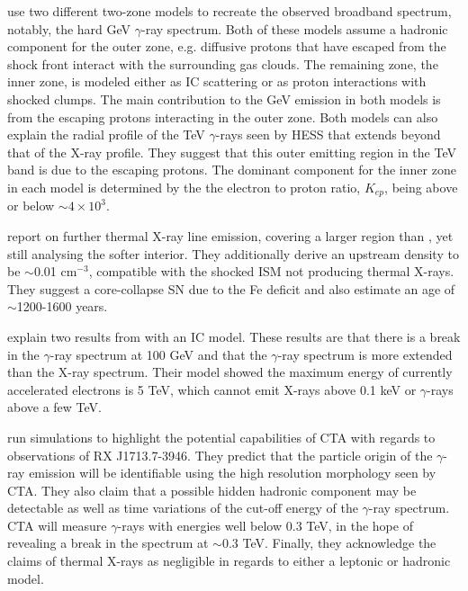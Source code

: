 \documentclass[12pt,a4paper]{article}
\begin{document}
\cite{2016ApJ...821...43Z} use two different two-zone models to recreate the observed broadband spectrum, notably, the hard GeV $\gamma$-ray spectrum. Both of these models assume a hadronic component for the outer zone, e.g. diffusive protons that have escaped from the shock front interact with the surrounding gas clouds. The remaining zone, the inner zone, is modeled either as IC scattering or as proton interactions with shocked clumps. The main contribution to the GeV emission in both models is from the escaping protons interacting in the outer zone. Both models can also explain the radial profile of the TeV $\gamma$-rays seen by HESS that extends beyond that of the X-ray profile. They suggest that this outer emitting region in the TeV band is due to the escaping protons. The dominant component for the inner zone in each model is determined by the the electron to proton ratio, $K_{ep}$, being above or below $\sim 4 \times 10^3$. 

\cite{2017IAUS..331..206K} report on further thermal X-ray line emission, covering a larger region than \cite{2015ApJ...814...29K}, yet still analysing the softer interior. They additionally derive an upstream density to be $\sim$0.01 cm$^{-3}$, compatible with the shocked ISM not producing thermal X-rays. They suggest a core-collapse SN due to the Fe deficit and also estimate an age of $\sim$1200-1600 years.

\cite{2017JHEAp..13...17O} explain two results from \cite{2018A&A...612A...6H} with an IC model. These results are that there is a break in the $\gamma$-ray spectrum at 100 GeV and that the $\gamma$-ray spectrum is more extended than the X-ray spectrum. Their model showed the maximum energy of currently accelerated electrons is 5 TeV, which cannot emit X-rays above 0.1 keV or $\gamma$-rays above a few TeV. 

\cite{2017ApJ...840...74A} run simulations to highlight the potential capabilities of CTA with regards to observations of RX J1713.7-3946. They predict that the particle origin of the $\gamma$-ray emission will be identifiable using the high resolution morphology seen by CTA. They also claim that a possible hidden hadronic component may be detectable as well as time variations of the cut-off energy of the $\gamma$-ray spectrum. CTA will measure $\gamma$-rays with energies well below 0.3 TeV, in the hope of revealing a break in the spectrum at $\sim$0.3 TeV. Finally, they acknowledge the claims of thermal X-rays \citep{2015ApJ...814...29K} as negligible in regards to either a leptonic or hadronic model. 
\end{document}
